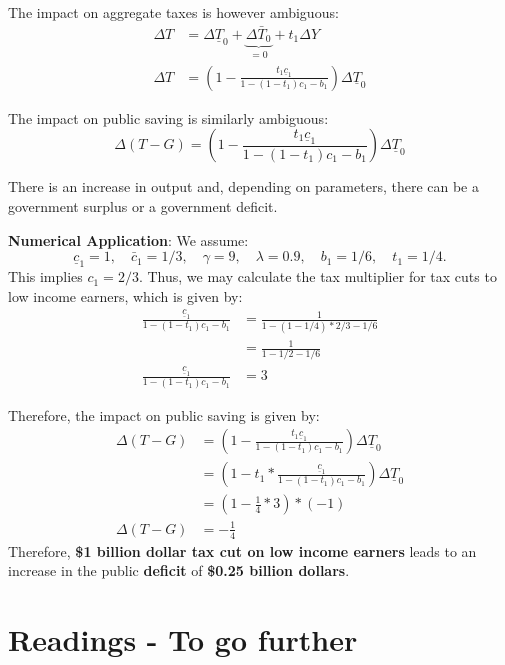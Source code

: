 \documentclass[]{book}
\theoremstyle{definition}
\theoremstyle{definition}
\theoremstyle{definition}
\theoremstyle{remark}
\begin{document}
The impact on aggregate taxes is however ambiguous: \[
\begin{aligned}
\Delta T    &=\Delta\underline{T}_{0}+\underbrace{\Delta\bar{T}_{0}}_{=0}+t_1\Delta Y\\
\Delta T    &=\left(1-\frac{t_1\underline{c}_{1}}{1-\left(1-t_{1}\right)c_{1}-b_{1}}\right)\Delta\underline{T}_{0}
\end{aligned}
\]

The impact on public saving is similarly ambiguous:
\[\Delta\left(T-G\right)=\left(1-\frac{t_1\underline{c}_{1}}{1-\left(1-t_{1}\right)c_{1}-b_{1}}\right)\Delta\underline{T}_{0}\]

There is an increase in output and, depending on parameters, there can
be a government surplus or a government deficit.

\textbf{Numerical Application}: We assume:
\[\underline{c}_{1}=1, \quad \bar{c}_{1}=1/3,\quad \gamma=9, \quad\lambda=0.9,\quad b_1=1/6, \quad t_1=1/4.\]
This implies \(c_1=2/3.\) Thus, we may calculate the tax multiplier for
tax cuts to low income earners, which is given by: \[
\begin{aligned}
\frac{\underline{c}_{1}}{1-(1-t_1)c_{1}-b_{1}} &= \frac{1}{1-(1-1/4)*2/3-1/6}\\
&= \frac{1}{1-1/2-1/6}\\
\frac{\underline{c}_{1}}{1-(1-t_1)c_{1}-b_{1}} &=3
\end{aligned}
\]

Therefore, the impact on public saving is given by: \[
\begin{aligned}
\Delta\left(T-G\right)&=\left(1-\frac{t_1\underline{c}_{1}}{1-\left(1-t_{1}\right)c_{1}-b_{1}}\right)\Delta\underline{T}_{0}\\
&=\left(1-t_1*\frac{\underline{c}_{1}}{1-\left(1-t_{1}\right)c_{1}-b_{1}}\right)\Delta\underline{T}_{0}\\
&=\left(1-\frac{1}{4}*3\right)*(-1)\\
\Delta\left(T-G\right)&=-\frac{1}{4}
\end{aligned}
\] Therefore, \textbf{\$1 billion dollar tax cut on low income earners}
leads to an increase in the public \textbf{deficit} of \textbf{\$0.25
billion dollars}.

\section*{Readings - To go further}\label{readings---to-go-further-6}
\end{document}
